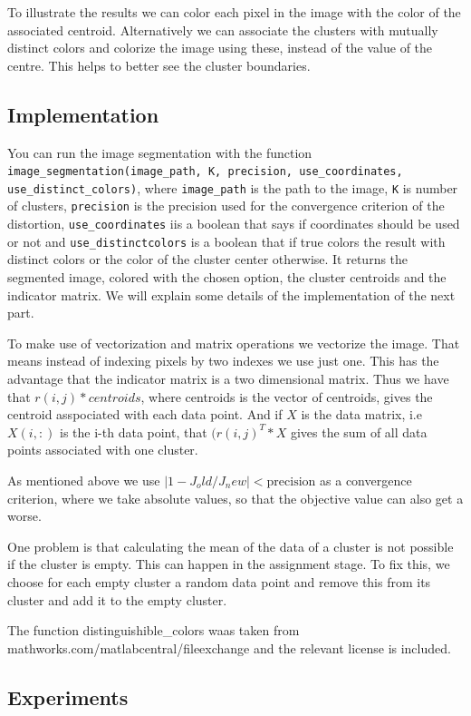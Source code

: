 To illustrate the results we can color each pixel in the image with the color of the associated centroid. Alternatively we can associate the clusters with mutually distinct colors and colorize the image using these, instead of the value of the centre. This helps to better see the cluster boundaries.

\subsection{Implementation}

You can run the image segmentation with the function \texttt{image\_segmentation(image\_path, K, precision, use\_coordinates, use\_distinct\_colors)}, where \texttt{image\_path} is the path to the image, \texttt{K} is number of clusters, \texttt{precision} is the precision used for the convergence criterion of the distortion, \texttt{use\_coordinates} iis a boolean that says if coordinates should be used or not and \texttt{use\_distinctcolors} is a boolean that if true colors the result with distinct colors or the color of the cluster center otherwise. It returns the segmented image, colored with the chosen option, the cluster centroids and the indicator matrix.
 We will explain some details of the implementation of the next part.

To make use of vectorization and matrix operations we vectorize the image. That means instead of indexing pixels by two indexes we use just one. This has the advantage that the indicator matrix is a two dimensional matrix. Thus we have that $r(i,j)*centroids$, where centroids is the vector of centroids, gives the centroid asspociated with each data point. And if $X$ is the data matrix, i.e $X(i,:)$ is the i-th data point, that $(r(i,j)^T * X$ gives the sum of all data points associated with one cluster.

As mentioned above we use $\vert 1-J_old/J_new\vert < \text{precision}$ as a convergence criterion, where we take absolute values, so that the objective value can also get a worse.

One problem is that calculating the mean of the data of a cluster is not possible if the cluster is empty. This can happen in the assignment stage. To fix this, we choose for each empty cluster a random data point and remove this from its cluster and add it to the empty cluster.

The function distinguishible\_colors waas taken from mathworks.com/matlabcentral/fileexchange and the relevant license is included.
\subsection{Experiments}

